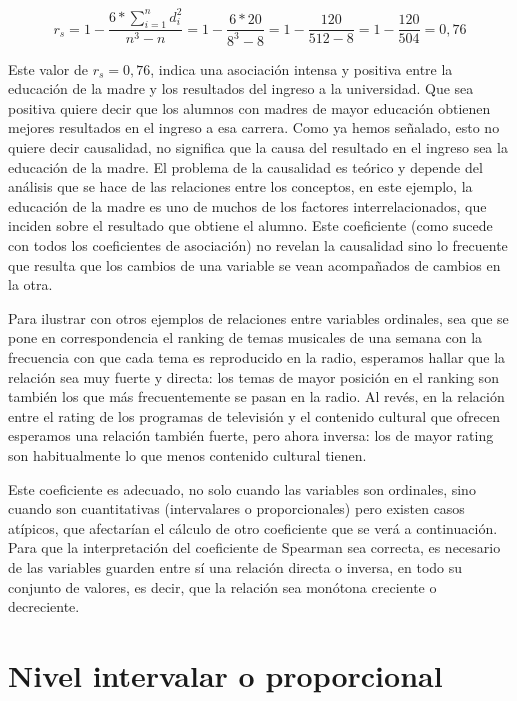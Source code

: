 \documentclass[]{book}
\begin{document}
\[r_{s} = 1 - \frac{6*\sum_{i = 1}^{n}d_{i}^{2}}{n^{3} - n} = 1 - \frac{6*20}{8^{3} - 8} = 1 - \frac{120}{512 - 8} = 1 - \frac{120}{504} = 0,76\]

Este valor de \(r_{s} = 0,76\), indica una asociación intensa y positiva
entre la educación de la madre y los resultados del ingreso a la
universidad. Que sea positiva quiere decir que los alumnos con madres de
mayor educación obtienen mejores resultados en el ingreso a esa carrera.
Como ya hemos señalado, esto no quiere decir causalidad, no significa
que la causa del resultado en el ingreso sea la educación de la madre.
El problema de la causalidad es teórico y depende del análisis que se
hace de las relaciones entre los conceptos, en este ejemplo, la
educación de la madre es uno de muchos de los factores
interrelacionados, que inciden sobre el resultado que obtiene el alumno.
Este coeficiente (como sucede con todos los coeficientes de asociación)
no revelan la causalidad sino lo frecuente que resulta que los cambios
de una variable se vean acompañados de cambios en la otra.

Para ilustrar con otros ejemplos de relaciones entre variables
ordinales, sea que se pone en correspondencia el ranking de temas
musicales de una semana con la frecuencia con que cada tema es
reproducido en la radio, esperamos hallar que la relación sea muy fuerte
y directa: los temas de mayor posición en el ranking son también los que
más frecuentemente se pasan en la radio. Al revés, en la relación entre
el rating de los programas de televisión y el contenido cultural que
ofrecen esperamos una relación también fuerte, pero ahora inversa: los
de mayor rating son habitualmente lo que menos contenido cultural
tienen.

Este coeficiente es adecuado, no solo cuando las variables son ordinales, sino cuando son cuantitativas (intervalares o proporcionales) pero existen casos atípicos, que afectarían el cálculo de otro coeficiente que se verá a continuación. Para que la interpretación del coeficiente de Spearman sea correcta, es necesario de las variables guarden entre sí una relación directa o inversa, en todo su conjunto de valores, es decir, que la relación sea monótona creciente o decreciente.

\hypertarget{nivel-intervalar-o-proporcional}{%
\section{Nivel intervalar o proporcional}\label{nivel-intervalar-o-proporcional}}
\end{document}

